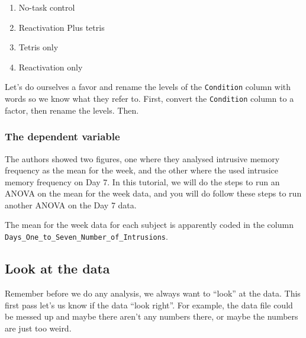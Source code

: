 \documentclass[]{book}
\newenvironment{Shaded}{\begin{snugshade}}{\end{snugshade}}
\newcommand{\KeywordTok}[1]{\textcolor[rgb]{0.13,0.29,0.53}{\textbf{{#1}}}}
\newcommand{\StringTok}[1]{\textcolor[rgb]{0.31,0.60,0.02}{{#1}}}
\newcommand{\NormalTok}[1]{{#1}}
\providecommand{\tightlist}{%
  \setlength{\itemsep}{0pt}\setlength{\parskip}{0pt}}
\theoremstyle{definition}
\theoremstyle{definition}
\theoremstyle{definition}
\theoremstyle{remark}
\begin{document}
\begin{enumerate}
\def\labelenumi{\arabic{enumi}.}
\tightlist
\item
  No-task control
\item
  Reactivation Plus tetris
\item
  Tetris only
\item
  Reactivation only
\end{enumerate}

Let's do ourselves a favor and rename the levels of the
\texttt{Condition} column with words so we know what they refer to.
First, convert the \texttt{Condition} column to a factor, then rename
the levels. Then.

\begin{Shaded}
\end{Shaded}

\subsubsection{The dependent variable}\label{the-dependent-variable}

The authors showed two figures, one where they analysed intrusive memory
frequency as the mean for the week, and the other where the used
intrusice memory frequency on Day 7. In this tutorial, we will do the
steps to run an ANOVA on the mean for the week data, and you will do
follow these steps to run another ANOVA on the Day 7 data.

The mean for the week data for each subject is apparently coded in the
column \texttt{Days\_One\_to\_Seven\_Number\_of\_Intrusions}.

\subsection{Look at the data}\label{look-at-the-data}

Remember before we do any analysis, we always want to ``look'' at the
data. This first pass let's us know if the data ``look right''. For
example, the data file could be messed up and maybe there aren't any
numbers there, or maybe the numbers are just too weird.
\end{document}
